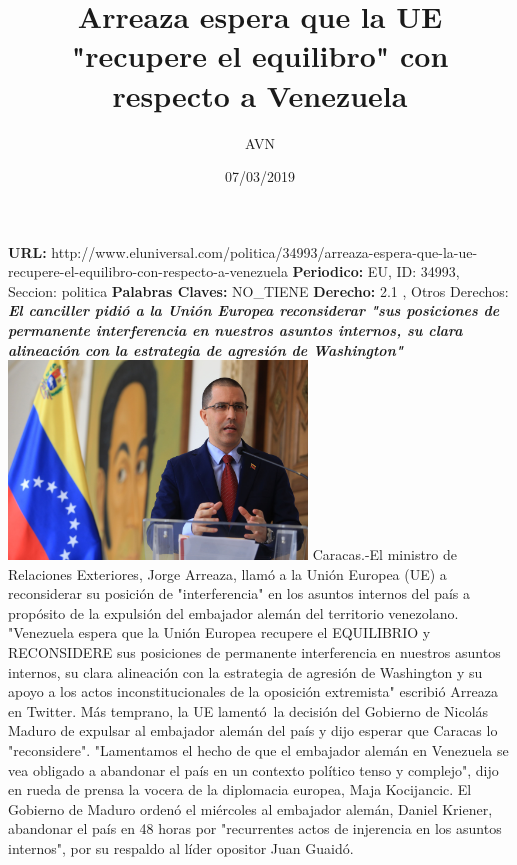 \documentclass{article}%
\title{\textbf{Arreaza espera que la UE "recupere el equilibro" con respecto a Venezuela}}%
\author{AVN}%
\date{07/03/2019}%
\begin{document}
%
\normalsize%
\maketitle%
\textbf{URL: }%
http://www.eluniversal.com/politica/34993/arreaza{-}espera{-}que{-}la{-}ue{-}recupere{-}el{-}equilibro{-}con{-}respecto{-}a{-}venezuela\newline%
%
\textbf{Periodico: }%
EU, %
ID: %
34993, %
Seccion: %
politica\newline%
%
\textbf{Palabras Claves: }%
NO\_TIENE\newline%
%
\textbf{Derecho: }%
2.1%
, Otros Derechos: %
\newline%
%
\textbf{\textit{El canciller pidió a la Unión Europea reconsiderar "sus posiciones de permanente interferencia en nuestros asuntos internos, su clara alineación con la estrategia de agresión de Washington"}}%
\newline%
\newline%
%
\includegraphics[width=300px]{EU_34993.jpg}%
\newline%
%
Caracas.{-}El ministro de Relaciones Exteriores, Jorge Arreaza, llamó a la Unión Europea (UE) a reconsiderar su posición de "interferencia" en los asuntos internos del país a propósito de la expulsión del embajador alemán del territorio venezolano.%
\newline%
%
"Venezuela espera que la Unión Europea recupere el EQUILIBRIO y RECONSIDERE sus posiciones de permanente interferencia en nuestros asuntos internos, su clara alineación con la estrategia de agresión de Washington y su apoyo a los actos inconstitucionales de la oposición extremista" escribió Arreaza en Twitter.%
\newline%
%
Más temprano, la UE lamentó~la decisión del Gobierno de Nicolás Maduro de expulsar al embajador alemán del país y dijo esperar que Caracas lo "reconsidere".%
\newline%
%
"Lamentamos el hecho de que el embajador alemán en Venezuela se vea obligado a abandonar el país en un contexto político tenso y complejo", dijo en rueda de prensa la vocera de la diplomacia europea, Maja Kocijancic.%
\newline%
%
El Gobierno de Maduro ordenó el miércoles al embajador alemán, Daniel Kriener, abandonar el país en 48 horas por "recurrentes actos de injerencia en los asuntos internos", por su respaldo al líder opositor Juan Guaidó.%
\newline%
%
\end{document}
